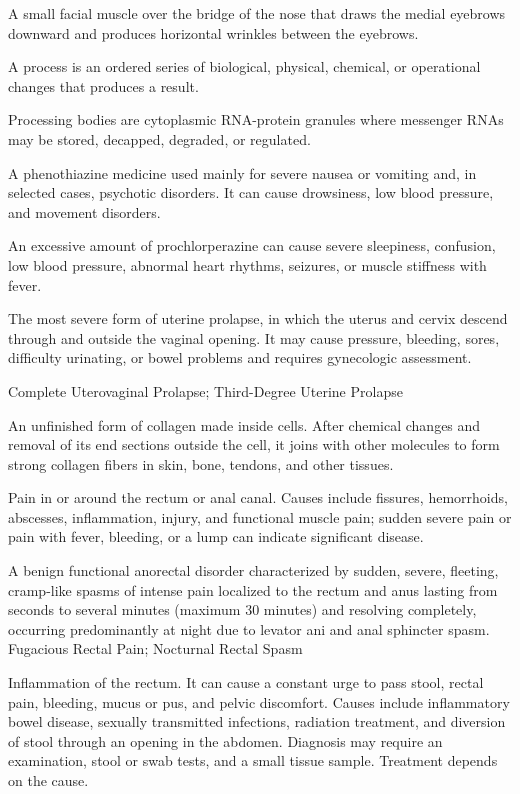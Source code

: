  A small facial muscle over the bridge of the nose that draws the medial eyebrows downward and produces horizontal wrinkles between the eyebrows.

 A process is an ordered series of biological, physical, chemical, or operational changes that produces a result.

 Processing bodies are cytoplasmic RNA-protein granules where messenger RNAs may be stored, decapped, degraded, or regulated.

 A phenothiazine medicine used mainly for severe nausea or vomiting and, in selected cases, psychotic disorders. It can cause drowsiness, low blood pressure, and movement disorders.

 An excessive amount of prochlorperazine can cause severe sleepiness, confusion, low blood pressure, abnormal heart rhythms, seizures, or muscle stiffness with fever.

 The most severe form of uterine prolapse, in which the uterus and cervix descend through and outside the vaginal opening. It may cause pressure, bleeding, sores, difficulty urinating, or bowel problems and requires gynecologic assessment.

\synonyms
Complete Uterovaginal Prolapse; Third-Degree Uterine Prolapse

 An unfinished form of collagen made inside cells. After chemical changes and removal of its end sections outside the cell, it joins with other molecules to form strong collagen fibers in skin, bone, tendons, and other tissues.

 Pain in or around the rectum or anal canal. Causes include fissures, hemorrhoids, abscesses, inflammation, injury, and functional muscle pain; sudden severe pain or pain with fever, bleeding, or a lump can indicate significant disease.

 A benign functional anorectal disorder characterized by sudden, severe, fleeting, cramp-like spasms of intense pain localized to the rectum and anus lasting from seconds to several minutes (maximum 30 minutes) and resolving completely, occurring predominantly at night due to levator ani and anal sphincter spasm.
\synonyms
Fugacious Rectal Pain; Nocturnal Rectal Spasm

 Inflammation of the rectum. It can cause a constant urge to pass stool, rectal pain, bleeding, mucus or pus, and pelvic discomfort. Causes include inflammatory bowel disease, sexually transmitted infections, radiation treatment, and diversion of stool through an opening in the abdomen. Diagnosis may require an examination, stool or swab tests, and a small tissue sample. Treatment depends on the cause.

